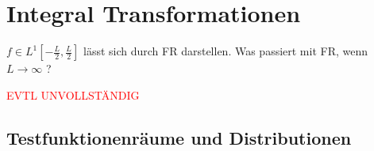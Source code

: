 \section{Integral Transformationen}

$f \in L^1[-\frac{L}{2}, \frac{L}{2}]$ lässt sich durch
FR darstellen. Was passiert mit FR, wenn 
$L \rightarrow \infty$ ?


















\textcolor{red}{EVTL UNVOLLSTÄNDIG}

\subsection{Testfunktionenräume und Distributionen}


